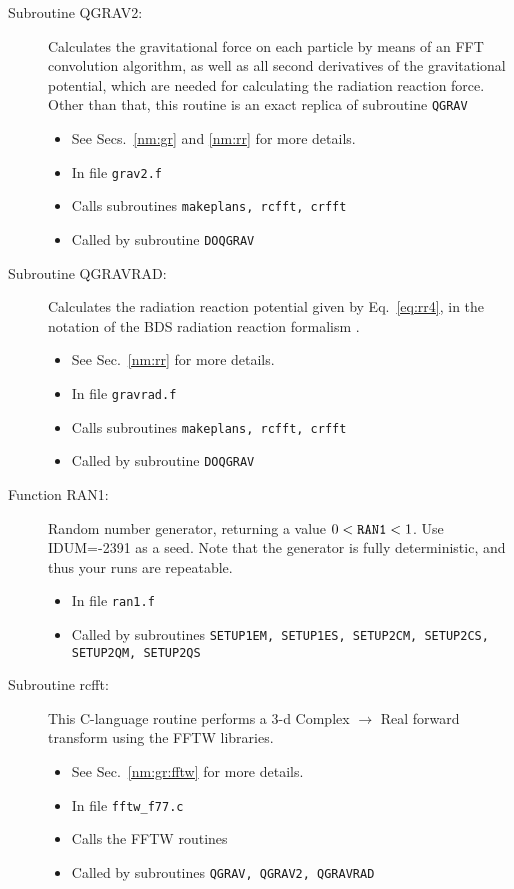 \begin{description}
\item[Subroutine QGRAV2:] Calculates the gravitational force on each
particle by means of an FFT convolution algorithm, as well as all
second derivatives of the gravitational potential, which are needed
for calculating the radiation reaction force.  Other than that, this
routine is an exact replica of subroutine {\tt QGRAV}
\begin{itemize} 
\item See Secs.~\ref{nm:gr} and \ref{nm:rr} for more details.
\item In file {\tt grav2.f}
\item Calls subroutines {\tt makeplans, rcfft, crfft}
\item Called by subroutine {\tt DOQGRAV}
\end{itemize}

\item[Subroutine QGRAVRAD:] Calculates the radiation reaction
potential given by Eq.~\ref{eq:rr4}, in the notation of the BDS
radiation reaction formalism \citep{BDS}.
\begin{itemize} 
\item See Sec.~\ref{nm:rr} for more details.
\item In file {\tt gravrad.f}
\item Calls subroutines {\tt makeplans, rcfft, crfft}
\item Called by subroutine {\tt DOQGRAV}
\end{itemize}

\item[Function RAN1:] Random number generator, returning a value
$0 < {\tt RAN1} < 1$.  Use IDUM=-2391 as a seed.  Note that the
generator is fully deterministic, and thus your runs are repeatable.
\begin{itemize} 
\item In file {\tt ran1.f}
\item Called by subroutines {\tt SETUP1EM, SETUP1ES, SETUP2CM,
SETUP2CS, SETUP2QM, SETUP2QS} 
\end{itemize}

\item[Subroutine rcfft:] This C-language routine performs a 3-d
Complex $\rightarrow$ Real forward transform using the FFTW libraries.
\begin{itemize} 
\item See Sec.~\ref{nm:gr:fftw} for more details.
\item In file {\tt fftw\_f77.c}
\item Calls the FFTW routines
\item Called by subroutines {\tt QGRAV, QGRAV2, QGRAVRAD}
\end{itemize} 


\end{description}
